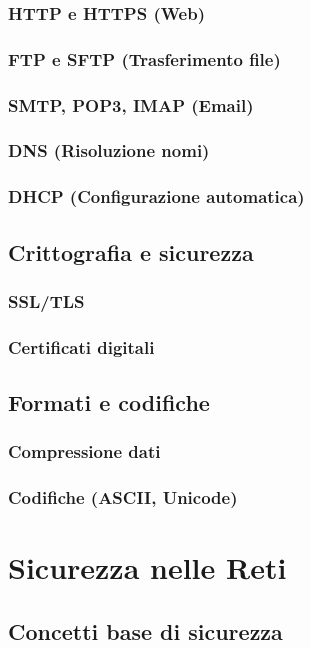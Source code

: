 \documentclass[12pt,a4paper]{article}
\begin{document}
\subsubsection{HTTP e HTTPS (Web)}
\subsubsection{FTP e SFTP (Trasferimento file)}
\subsubsection{SMTP, POP3, IMAP (Email)}
\subsubsection{DNS (Risoluzione nomi)}
\subsubsection{DHCP (Configurazione automatica)}
\subsection{Crittografia e sicurezza}
\subsubsection{SSL/TLS}
\subsubsection{Certificati digitali}
\subsection{Formati e codifiche}
\subsubsection{Compressione dati}
\subsubsection{Codifiche (ASCII, Unicode)}

\section{Sicurezza nelle Reti}
\subsection{Concetti base di sicurezza}
\end{document}
